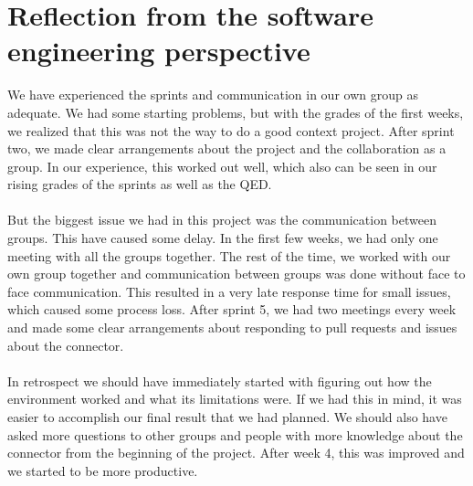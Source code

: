 \section{Reflection from the software engineering perspective}
We have experienced the sprints and communication in our own group as adequate. We had some starting problems, but with the grades of the first weeks, we realized that this was not the way to do a good context project. After sprint two, we made clear arrangements about the project and the collaboration as a group. In our experience, this worked out well, which also can be seen in our rising grades of the sprints as well as the QED.
\\\\
But the biggest issue we had in this project was the communication between groups. This have caused some delay. In the first few weeks, we had only one meeting with all the groups together. The rest of the time, we worked with our own group together and communication between groups was done without face to face communication. This resulted in a very late response time for small issues, which caused some process loss. After sprint 5, we had two meetings every week and made some clear arrangements about responding to pull requests and issues about the connector.
\\\\
In retrospect we should have immediately started with figuring out how the environment worked and what its limitations were. If we had this in mind, it was easier to accomplish our final result that we had planned. We should also have asked more questions to other groups and people with more knowledge about the connector from the beginning of the project. After week 4, this was improved and we started to be more productive. 


